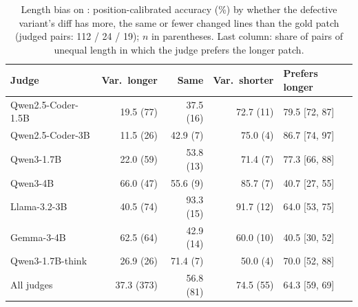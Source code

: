 \begin{table}[t]
\caption{Length bias on \RJB{}: position-calibrated accuracy (\%) by whether the defective variant's diff has more, the same or fewer changed lines than the gold patch (judged pairs: 112 / 24 / 19); $n$ in parentheses. Last column: share of pairs of unequal length in which the judge prefers the longer patch.}
\label{tab:length}
\centering\scriptsize
\setlength{\tabcolsep}{2.5pt}
\begin{tabular}{@{}lrrrl@{}}
\toprule
Judge & Var.\ longer & Same & Var.\ shorter & Prefers longer \\
\midrule
Qwen2.5-Coder-1.5B & 19.5 (77) & 37.5 (16) & 72.7 (11) & 79.5 [72, 87] \\
Qwen2.5-Coder-3B & 11.5 (26) & 42.9 (7) & 75.0 (4) & 86.7 [74, 97] \\
Qwen3-1.7B & 22.0 (59) & 53.8 (13) & 71.4 (7) & 77.3 [66, 88] \\
Qwen3-4B & 66.0 (47) & 55.6 (9) & 85.7 (7) & 40.7 [27, 55] \\
Llama-3.2-3B & 40.5 (74) & 93.3 (15) & 91.7 (12) & 64.0 [53, 75] \\
Gemma-3-4B & 62.5 (64) & 42.9 (14) & 60.0 (10) & 40.5 [30, 52] \\
Qwen3-1.7B-think & 26.9 (26) & 71.4 (7) & 50.0 (4) & 70.0 [52, 88] \\
All judges & 37.3 (373) & 56.8 (81) & 74.5 (55) & 64.3 [59, 69] \\
\bottomrule
\end{tabular}
\end{table}
